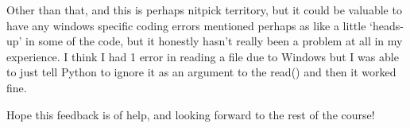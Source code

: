 \documentclass[11pt]{article}
\begin{document}
Other than that, and this is perhaps nitpick territory, but it could be
valuable to have any windows specific coding errors mentioned perhaps as
like a little `heads-up' in some of the code, but it honestly hasn't
really been a problem at all in my experience. I think I had 1 error in
reading a file due to Windows but I was able to just tell Python to
ignore it as an argument to the read() and then it worked fine.

Hope this feedback is of help, and looking forward to the rest of the
course!


    
    
    
\end{document}
